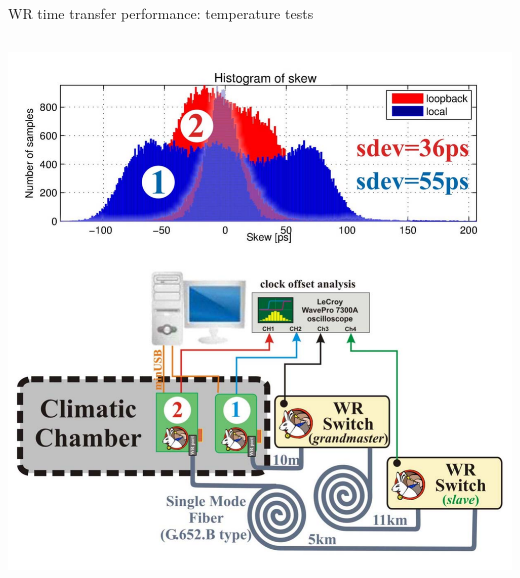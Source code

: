 \documentclass[compress,red]{beamer}
\newcommand{\backupend}{
   \addtocounter{framenumberappendix}{-\value{framenumber}}
   \addtocounter{framenumber}{\value{framenumberappendix}} 
}
\begin{document}
\begin{frame}{WR time transfer performance: temperature tests}
\begin{columns}[c]
		\hspace{-0.8cm}
		\begin{center}
		\includegraphics[width=1.13\textwidth]{measurements/tempTests-2-combo.pdf}
		\end{center}


  \end{columns} 
\end{frame}



\backupend

\end{document}
